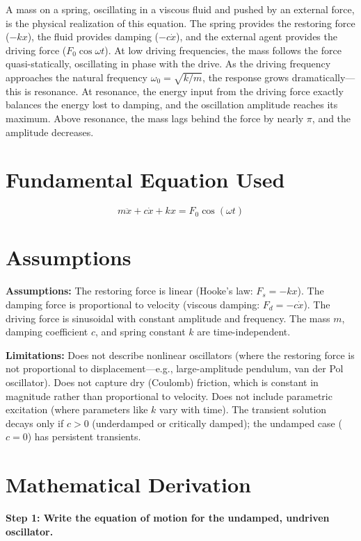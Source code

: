 \documentclass[11pt,openright]{book}
\begin{document}
A mass on a spring, oscillating in a viscous fluid and pushed by an external force, is the physical realization of this equation. The spring provides the restoring force ($-kx$), the fluid provides damping ($-c\dot{x}$), and the external agent provides the driving force ($F_0\cos\omega t$). At low driving frequencies, the mass follows the force quasi-statically, oscillating in phase with the drive. As the driving frequency approaches the natural frequency $\omega_0 = \sqrt{k/m}$, the response grows dramatically---this is resonance. At resonance, the energy input from the driving force exactly balances the energy lost to damping, and the oscillation amplitude reaches its maximum. Above resonance, the mass lags behind the force by nearly $\pi$, and the amplitude decreases.
\section*{Fundamental Equation Used}

\begin{equation}
m\ddot{x} + c\dot{x} + kx = F_0\cos(\omega t)
\end{equation}
\section*{Assumptions}

\textbf{Assumptions:} The restoring force is linear (Hooke's law: $F_s = -kx$). The damping force is proportional to velocity (viscous damping: $F_d = -c\dot{x}$). The driving force is sinusoidal with constant amplitude and frequency. The mass $m$, damping coefficient $c$, and spring constant $k$ are time-independent.


\textbf{Limitations:} Does not describe nonlinear oscillators (where the restoring force is not proportional to displacement---e.g., large-amplitude pendulum, van der Pol oscillator). Does not capture dry (Coulomb) friction, which is constant in magnitude rather than proportional to velocity. Does not include parametric excitation (where parameters like $k$ vary with time). The transient solution decays only if $c > 0$ (underdamped or critically damped); the undamped case ($c = 0$) has persistent transients.


\section*{Mathematical Derivation}

\textbf{Step 1: Write the equation of motion for the undamped, undriven oscillator.}
\end{document}
